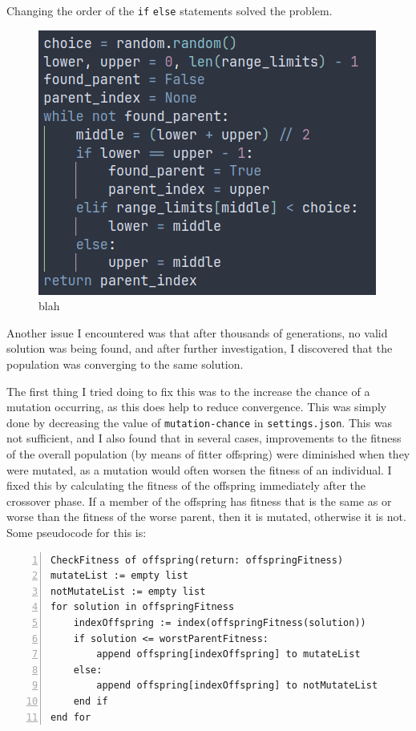 \documentclass[a4paper, 12pt]{report}
\begin{document}
Changing the order of the \verb|if| \verb|else| statements solved the problem.

\begin{figure}[ht]
	\centering
	\includegraphics[scale=0.5]{images/binary-search-5}
	\caption{blah}  %
	\label{fig:code-3}
\end{figure}

\newpage

Another issue I encountered was that after thousands of generations, no valid 
solution was being found, and after further investigation, I discovered that the
population was converging to the same solution.

The first thing I tried doing to fix this was to the increase the chance of a
mutation occurring, as this does help to reduce convergence. 
This was simply done by decreasing the value of \verb|mutation-chance| in 
\verb|settings.json|.
This was not sufficient, and I also found that in several cases, improvements to
the fitness of the overall population (by means of fitter offspring) were 
diminished when they were mutated, as a mutation would often worsen the fitness 
of an individual.
I fixed this by calculating the fitness of the offspring immediately after the 
crossover phase.
If a member of the offspring has fitness that is the same as or worse than the
fitness of the worse parent, then it is mutated, otherwise it is not.
Some pseudocode for this is:

\begin{Verbatim}[numbers=left, fontsize=\footnotesize]
CheckFitness of offspring(return: offspringFitness)
mutateList := empty list
notMutateList := empty list
for solution in offspringFitness
    indexOffspring := index(offspringFitness(solution))
    if solution <= worstParentFitness:
        append offspring[indexOffspring] to mutateList
    else:
        append offspring[indexOffspring] to notMutateList
    end if
end for
\end{Verbatim}
\end{document}
